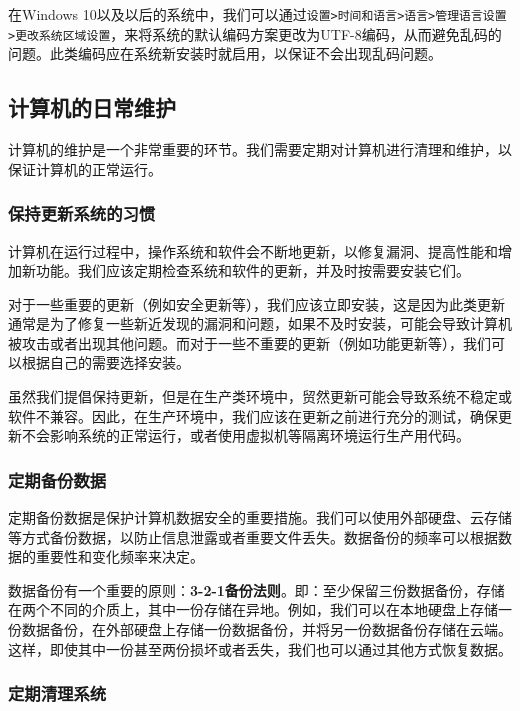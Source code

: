 在Windows 10以及以后的系统中，我们可以通过\texttt{设置>时间和语言>语言>管理语言设置>更改系统区域设置}，来将系统的默认编码方案更改为UTF-8编码，从而避免乱码的问题。此类编码应在系统新安装时就启用，以保证不会出现乱码问题。

\subsection{计算机的日常维护}

计算机的维护是一个非常重要的环节。我们需要定期对计算机进行清理和维护，以保证计算机的正常运行。

\subsubsection{保持更新系统的习惯}

计算机在运行过程中，操作系统和软件会不断地更新，以修复漏洞、提高性能和增加新功能。我们应该定期检查系统和软件的更新，并及时按需要安装它们。

对于一些重要的更新（例如安全更新等），我们应该立即安装，这是因为此类更新通常是为了修复一些新近发现的漏洞和问题，如果不及时安装，可能会导致计算机被攻击或者出现其他问题。而对于一些不重要的更新（例如功能更新等），我们可以根据自己的需要选择安装。

\begin{caution}
  虽然我们提倡保持更新，但是在生产类环境中，贸然更新可能会导致系统不稳定或软件不兼容。因此，在生产环境中，我们应该在更新之前进行充分的测试，确保更新不会影响系统的正常运行，或者使用虚拟机等隔离环境运行生产用代码。
\end{caution}

\subsubsection{定期备份数据}

定期备份数据是保护计算机数据安全的重要措施。我们可以使用外部硬盘、云存储等方式备份数据，以防止信息泄露或者重要文件丢失。数据备份的频率可以根据数据的重要性和变化频率来决定。

数据备份有一个重要的原则：\textbf{3-2-1备份法则}。即：至少保留三份数据备份，存储在两个不同的介质上，其中一份存储在异地。例如，我们可以在本地硬盘上存储一份数据备份，在外部硬盘上存储一份数据备份，并将另一份数据备份存储在云端。这样，即使其中一份甚至两份损坏或者丢失，我们也可以通过其他方式恢复数据。

\subsubsection{定期清理系统}

